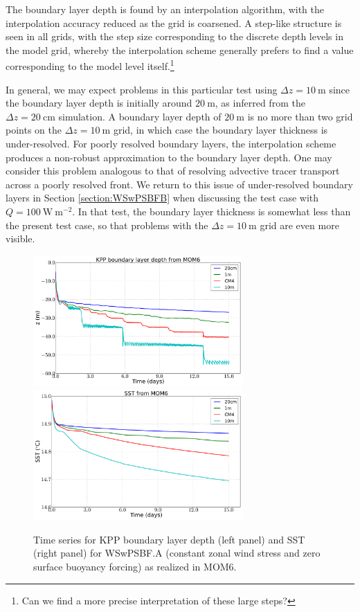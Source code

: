 The boundary layer depth is found by an interpolation algorithm, with
the interpolation accuracy reduced as the grid is coarsened.  A
step-like structure is seen in all grids, with the step size
corresponding to the discrete depth levels in the model grid, whereby
the interpolation scheme generally prefers to find a value
corresponding to the model level itself.\footnote{Can we find a more
  precise interpretation of these large steps?}  

In general, we may expect problems in this particular test using
$\Delta z = 10~\mbox{m}$ since the boundary layer depth is initially
around $20~\mbox{m}$, as inferred from the $\Delta z = 20~\mbox{cm}$
simulation.  A boundary layer depth of $20~\mbox{m}$ is no more than
two grid points on the $\Delta z = 10~\mbox{m}$ grid, in which case
the boundary layer thickness is under-resolved.  For poorly resolved
boundary layers, the interpolation scheme produces a non-robust
approximation to the boundary layer depth.  One may consider this
problem analogous to that of resolving advective tracer transport
across a poorly resolved front.  We return to this issue of
under-resolved boundary layers in Section \ref{section:WSwPSBFB} when
discussing the test case with $Q=100~\mbox{W}~\mbox{m}^{-2}$.  In that
test, the boundary layer thickness is somewhat less than the present
test case, so that problems with the $\Delta z = 10~\mbox{m}$ grid are
even more visible.

\begin{figure}[h!t]
\begin{center}
\includegraphics[angle=0,width=8cm]{./figs/MOM6/WSwPSBF_A_MOM6_KPP_bldepth.png}
\includegraphics[angle=0,width=8cm]{./figs/MOM6/WSwPSBF_A_MOM6_SST.png}
\caption[KPP boundary layer depth and SST from MOM6 for WSwPSBF.A
]{\sf Time series for KPP boundary layer depth (left panel) and SST
  (right panel) for WSwPSBF.A (constant zonal wind stress and zero
  surface buoyancy forcing) as realized in MOM6.}
\label{fig:WSwPSBF_A_MOM6_SST_bldepth}
\end{center}
\end{figure}


